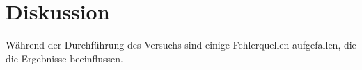 \newpage
\section{Diskussion}
\label{sec:Diskussion}
Während der Durchführung des Versuchs sind einige Fehlerquellen aufgefallen, die die Ergebnisse beeinflussen.



